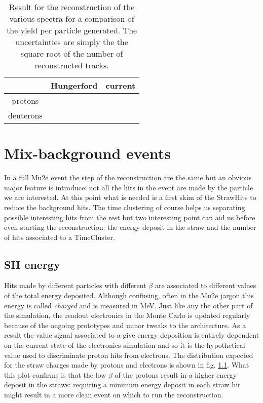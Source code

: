\documentclass[12pt,a4paper,openright, oneside, titlepage]{book} %
\begin{document}
\begin{table}
\centering
\begin{tabular}{|c|c|c|}
\hline
 & Hungerford & current \\
\hline
\hline
protons & & \\
\hline
deuterons & & \\
\hline
\end{tabular}
\caption{Result for the reconstruction of the various spectra for a comparison of the yield per particle generated. The uncertainties are simply the the square root of the number of reconstructed tracks.}
\label{T_syst}
\end{table}

\section{Mix-background events}
In a full Mu2e event the step of the reconstruction are the same but an obvious major feature is introduce: not all the hits in the event are made by the particle we are interested.
At this point what is needed is a first skim of the StrawHits to reduce the background hits.
The time clustering of course helps us separating possible interesting hits from the rest but two interesting point can aid us before even starting the reconstruction: the energy deposit in the straw and the number of hits associated to a TimeCluster.

\subsection{SH energy}
Hits made by different particles with different $\beta$ are associated to different values of the total energy deposited. 
Although confusing, often in the Mu2e jargon this energy is called \textit{charged} and is measured in MeV.
Just like any the other part of the simulation, the readout electronics in the Monte Carlo is updated regularly because of the ongoing prototypes and minor tweaks to the architecture. 
As a result the value signal associated to a give energy deposition is entirely dependent on the current state of the electronics simulation and so it is the hypothetical value used to discriminate proton hits from electrons.
The distribution expected for the straw charges made by protons and electrons is shown in fig. \ref{}.
What this plot confirms is that the low $\beta$ of the protons result in a higher energy deposit in the straws: requiring a minimum energy deposit in each straw hit might result in a more clean event on which to run the reconstruction.\\
\end{document}
